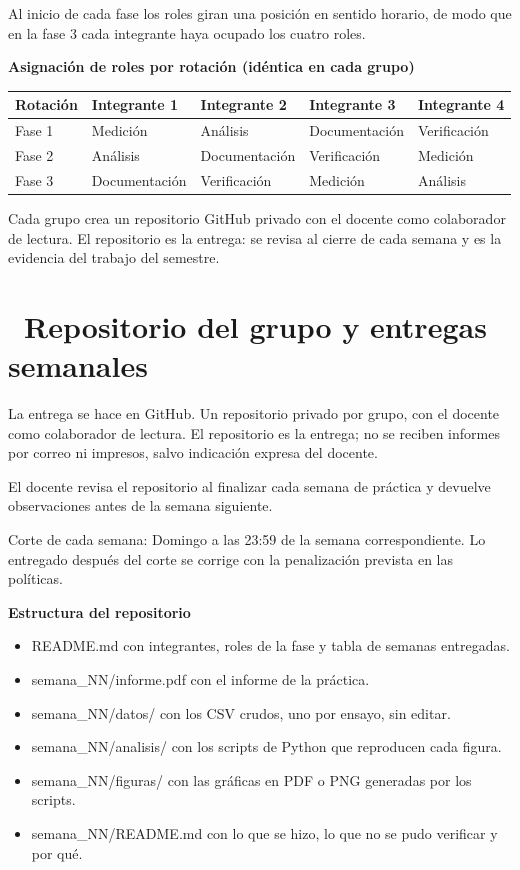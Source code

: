 \documentclass[11pt,a4paper]{article}
\newcommand{\iconotexto}[2]{\textcolor{cyanNeon}{\faIcon{#1}}~#2}
\begin{document}
Al inicio de cada fase los roles giran una posición en sentido horario, de modo que en la fase 3 cada integrante haya ocupado los cuatro roles.

\textbf{Asignación de roles por rotación (idéntica en cada grupo)}

\begin{tabularx}{\linewidth}{@{}l X X X X@{}}
\toprule
Rotación & Integrante 1 & Integrante 2 & Integrante 3 & Integrante 4 \\
\midrule
Fase 1 & Medición & Análisis & Documentación & Verificación \\
Fase 2 & Análisis & Documentación & Verificación & Medición \\
Fase 3 & Documentación & Verificación & Medición & Análisis \\
\bottomrule
\end{tabularx}

Cada grupo crea un repositorio GitHub privado con el docente como colaborador de lectura. El repositorio es la entrega: se revisa al cierre de cada semana y es la evidencia del trabajo del semestre.

\section{\iconotexto{code-branch}{Repositorio del grupo y entregas semanales}}

La entrega se hace en GitHub. Un repositorio privado por grupo, con el docente como colaborador de lectura. El repositorio es la entrega; no se reciben informes por correo ni impresos, salvo indicación expresa del docente.

El docente revisa el repositorio al finalizar cada semana de práctica y devuelve observaciones antes de la semana siguiente.

Corte de cada semana: Domingo a las 23:59 de la semana correspondiente. Lo entregado después del corte se corrige con la penalización prevista en las políticas.

\textbf{Estructura del repositorio}

\begin{itemize}[leftmargin=1.4em,itemsep=2pt,topsep=3pt]
  \item README.md con integrantes, roles de la fase y tabla de semanas entregadas.
  \item semana\_NN/informe.pdf con el informe de la práctica.
  \item semana\_NN/datos/ con los CSV crudos, uno por ensayo, sin editar.
  \item semana\_NN/analisis/ con los scripts de Python que reproducen cada figura.
  \item semana\_NN/figuras/ con las gráficas en PDF o PNG generadas por los scripts.
  \item semana\_NN/README.md con lo que se hizo, lo que no se pudo verificar y por qué.
\end{itemize}
\end{document}
